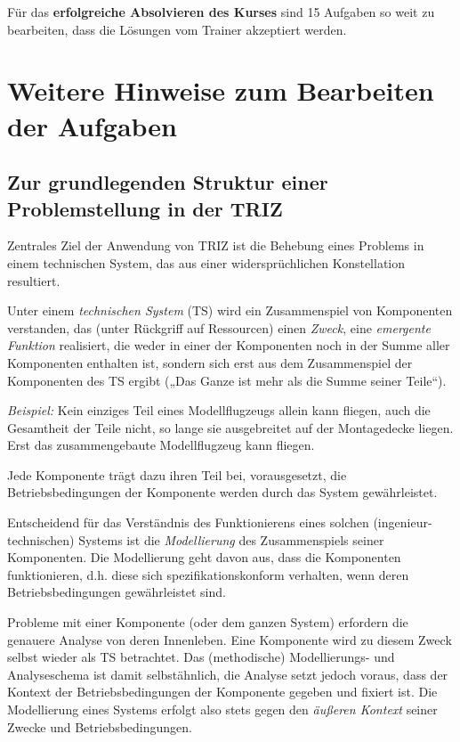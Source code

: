 \documentclass[11pt,a4paper]{article}
\begin{document}
Für das \textbf{erfolgreiche Absolvieren des Kurses} sind 15 Aufgaben so weit
zu bearbeiten, dass die Lösungen vom Trainer akzeptiert werden.

\section{Weitere Hinweise zum Bearbeiten der Aufgaben}

\subsection{Zur grundlegenden Struktur einer Problemstellung in der TRIZ}

Zentrales Ziel der Anwendung von TRIZ ist die Behebung eines Problems in einem
technischen System, das aus einer widersprüchlichen Konstellation
resultiert.

Unter einem \emph{technischen System} (TS) wird ein Zusammenspiel von
Komponenten verstanden, das (unter Rückgriff auf Ressourcen) einen
\emph{Zweck}, eine \emph{emergente Funktion} realisiert, die weder in einer
der Komponenten noch in der Summe aller Komponenten enthalten ist, sondern
sich erst aus dem Zusammenspiel der Komponenten des TS ergibt („Das Ganze ist
mehr als die Summe seiner Teile“).

\emph{Beispiel:} Kein einziges Teil eines Modellflugzeugs allein kann fliegen,
auch die Gesamtheit der Teile nicht, so lange sie ausgebreitet auf der
Montagedecke liegen. Erst das zusammengebaute Modellflugzeug kann fliegen.

Jede Komponente trägt dazu ihren Teil bei, vorausgesetzt, die
Betriebsbedingungen der Komponente werden durch das System gewährleistet.

Entscheidend für das Verständnis des Funktionierens eines solchen
(ingenieur-technischen) Systems ist die \emph{Modellierung} des Zusammenspiels
seiner Komponenten. Die Modellierung geht davon aus, dass die Komponenten
funktionieren, d.h. diese sich spezifikationskonform verhalten, wenn deren
Betriebsbedingungen gewährleistet sind.

Probleme mit einer Komponente (oder dem ganzen System) erfordern die genauere
Analyse von deren Innenleben. Eine Komponente wird zu diesem Zweck selbst
wieder als TS betrachtet. Das (methodische) Modellierungs- und Analyseschema
ist damit selbstähnlich, die Analyse setzt jedoch voraus, dass der Kontext der
Betriebsbedingungen der Komponente gegeben und fixiert ist.  Die Modellierung
eines Systems erfolgt also stets gegen den \emph{äußeren Kontext} seiner
Zwecke und Betriebsbedingungen.
\end{document}
